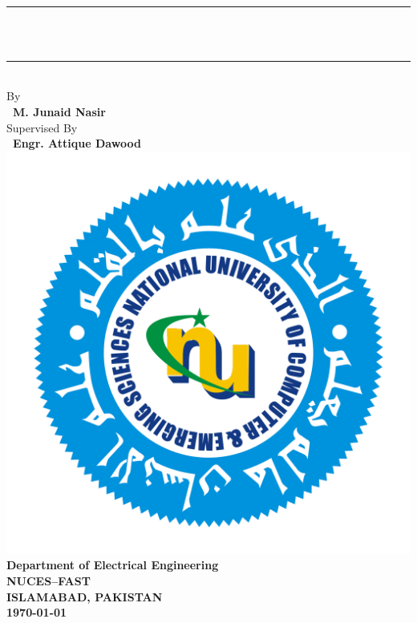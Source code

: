 \documentclass[11pt, a4paper, twoside]{Thesis} %
\begin{document}
\begin{titlepage}
\begin{center}

\textsc{\LARGE \univname}\\[0.5cm] %
\rule{\linewidth}{0.5mm}\\[0.3cm]
{\Large \bfseries \ttitle}\\
\rule{\linewidth}{0.5mm}\\[0.5cm]

{\large By}\\[0.2cm]
{\large \bfseries \ M. Junaid Nasir}\\[1.5cm]


{\large Supervised By}\\[0.2cm]
{\large \bfseries \ Engr. Attique Dawood}\\[1.9cm]


\includegraphics[scale=0.15]{Figures/NU_Logo.png}\\[0.8cm]

{\large \bfseries Department of Electrical Engineering}\\[0.2cm]
{\large \bfseries NUCES--FAST}\\[0.2cm]
{\large \bfseries ISLAMABAD, PAKISTAN}\\[0.2cm]
{\large \bfseries \today}

\end{center}
\end{titlepage}
\end{document}
